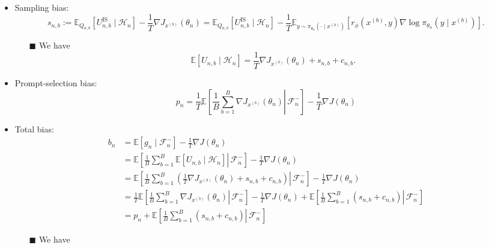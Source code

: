 \documentclass[10pt]{article}
\newcommand{\E}{\mathbb{E}}
\newcommand{\F}{\mathcal{F}}
\newcommand{\Hh}{\mathcal{H}}
\newcommand{\grad}{\nabla}
\newcommand{\xs}{x^{(b)}}
\theoremstyle{preserved}
\begin{document}
\begin{itemize}
\begin{itemize}
    \item Sampling bias: \begin{equation*}
    s_{n,b}:=\E_{Q_{n,b}}[U_{n,b}^{\mathrm{IS}}\mid\Hh_n]-\frac1T\grad J_{x^{(b)}}(\theta_n)
    =\E_{Q_{n,b}}[U_{n,b}^{\mathrm{IS}}\mid\Hh_n]-\frac1T\E_{y\sim\pi_{\theta_n}(\cdot\mid\xs)}[r_\phi(\xs,y)\nabla \log \pi_{\theta_n}\left(y \mid x^{(b)}\right)].
    \end{equation*}
    \begin{itemize}
        \item[$\blacksquare$] We have \begin{equation*} \E[U_{n,b}\mid\Hh_n]=\frac1T\grad J_{x^{(b)}}(\theta_n)+s_{n,b}+c_{n,b}.\label{eq:step-2}
        \end{equation*}
    \end{itemize}
    \item Prompt-selection bias:
    \begin{equation*} p_n=\frac{1}{T} \mathbb{E}\left[\left.\frac{1}{B} \sum_{b=1}^B \nabla J_{x^{(b)}}\left(\theta_n\right) \right\rvert\, \mathcal{F}_n^{-}\right]-\frac{1}{T} \nabla J\left(\theta_n\right) 
    \end{equation*}
    \item Total bias: 
        \begin{align*}
        b_n &= \E[g_n\mid\F_n^-] - \frac{1}{T} \nabla J\left(\theta_n\right)\\&=\mathbb{E}\left[\left.\frac{1}{B} \sum_{b=1}^B \mathbb{E}\left[U_{n, b} \mid \mathcal{H}_n\right] \right\rvert\, \mathcal{F}_n^{-}\right]-\frac{1}{T} \nabla J\left(\theta_n\right) \\
        & =\mathbb{E}\left[\left.\frac{1}{B} \sum_{b=1}^B\left(\frac{1}{T} \nabla J_{x^{(b)}}\left(\theta_n\right)+s_{n, b}+c_{n, b}\right) \right\rvert\, \mathcal{F}_n^{-}\right]-\frac{1}{T} \nabla J\left(\theta_n\right) \\
        & =\frac{1}{T} \mathbb{E}\left[\left.\frac{1}{B} \sum_{b=1}^B \nabla J_{x^{(b)}}\left(\theta_n\right) \right\rvert\, \mathcal{F}_n^{-}\right]-\frac{1}{T} \nabla J\left(\theta_n\right) +\mathbb{E}\left[\left.\frac{1}{B} \sum_{b=1}^B\left(s_{n, b}+c_{n, b}\right) \right\rvert\, \mathcal{F}_n^{-}\right] \\
        &= p_n+\mathbb{E}\left[\left.\frac{1}{B} \sum_{b=1}^B\left(s_{n, b}+c_{n, b}\right) \right\rvert\, \mathcal{F}_n^{-}\right]
        \end{align*}
        \begin{itemize}
        \item[$\blacksquare$] We have \begin{align*}

\end{align*}
\end{itemize}
\end{itemize}
\end{itemize}
\end{document}
